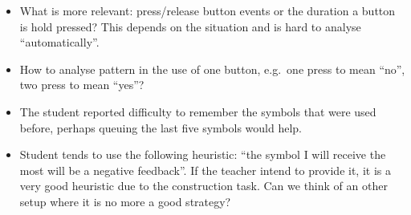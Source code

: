 \begin{itemize}
    \item What is more relevant: press/release button events or the duration a button is hold pressed? This depends on the situation and is hard to analyse ``automatically''.
    \item How to analyse pattern in the use of one button, e.g.\ one press to mean ``no'', two press to mean ``yes''?
    \item The student reported difficulty to remember the symbols that were used before, perhaps queuing the last five symbols would help. 
    \item Student tends to use the following heuristic: ``the symbol I will receive the most will be a negative feedback''. If the teacher intend to provide it, it is a very good heuristic due to the construction task. Can we think of an other setup where it is no more a good strategy?
\end{itemize}
